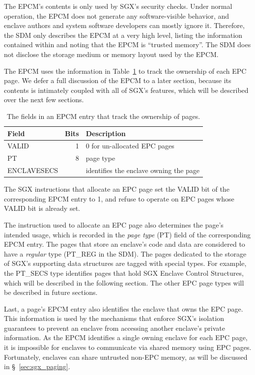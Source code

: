 The EPCM's contents is only used by SGX's security checks. Under normal
operation, the EPCM does not generate any software-visible behavior, and
enclave authors and system software developers can mostly ignore it.
Therefore, the SDM only describes the EPCM at a very high level, listing the
information contained within and noting that the EPCM is ``trusted memory''.
The SDM does not disclose the storage medium or memory layout used by the EPCM.

The EPCM uses the information in Table~\ref{fig:sgx_epcm_ownership_fields} to
track the ownership of each EPC page. We defer a full discussion of the EPCM to
a later section, because its contents is intimately coupled with all of SGX's
features, which will be described over the next few sections.

\begin{table}[hbt]
  \centering
  \begin{tabularx}{\columnwidth}{| l | r | X |}
  \hline
  \textbf{Field} & \textbf{Bits} & \textbf{Description}\\
  \hline
  VALID & 1 & 0 for un-allocated EPC pages \\
  \hline
  PT & 8 & page type \\
  \hline
  ENCLAVESECS &  & identifies the enclave owning the page \\
  \hline
  \end{tabularx}
  \caption{
    The fields in an EPCM entry that track the ownership of pages.
  }
  \label{fig:sgx_epcm_ownership_fields}
\end{table}

The SGX instructions that allocate an EPC page set the VALID bit of the
corresponding EPCM entry to 1, and refuse to operate on EPC pages whose VALID
bit is already set.

The instruction used to allocate an EPC page also determines the page's
intended usage, which is recorded in the \textit{page type} (PT) field of the
corresponding EPCM entry. The pages that store an enclave's code and data are
considered to have a \textit{regular} type (PT\_REG in the SDM). The pages
dedicated to the storage of SGX's supporting data structures are tagged with
special types. For example, the PT\_SECS type identifies pages that hold SGX
Enclave Control Structures, which will be described in the following section.
The other EPC page types will be described in future sections.

Last, a page's EPCM entry also identifies the enclave that owns the EPC page.
This information is used by the mechanisms that enforce SGX's isolation
guarantees to prevent an enclave from accessing another enclave's private
information. As the EPCM identifies a single owning enclave for each EPC page,
it is impossible for enclaves to communicate via shared memory using EPC pages.
Fortunately, enclaves can share untrusted non-EPC memory, as will be discussed
in \S~\ref{sec:sgx_paging}.


